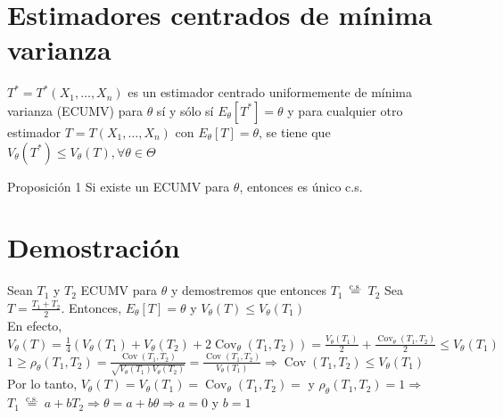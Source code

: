 \section*{Estimadores centrados de mínima varianza}
$T^{*}=T^{*}\left(X_{1}, \ldots, X_{n}\right)$ es un estimador centrado uniformemente de mínima varianza (ECUMV) para $\theta$ sí y sólo sí $E_{\theta}\left[T^{*}\right]=\theta$ y para cualquier otro estimador $T=T\left(X_{1}, \ldots, X_{n}\right)$ con $E_{\theta}[T]=\theta$, se tiene que $V_{\theta}\left(T^{*}\right) \leq V_{\theta}(T), \forall \theta \in \Theta$

Proposición 1 Si existe un ECUMV para $\theta$, entonces es único c.s.

\section*{Demostración}
Sean $T_{1}$ y $T_{2}$ ECUMV para $\theta$ y demostremos que entonces $T_{1} \stackrel{\text { c.s. }}{=} T_{2}$ Sea $T=\frac{T_{1}+T_{2}}{2}$. Entonces, $E_{\theta}[T]=\theta$ y $V_{\theta}(T) \leq V_{\theta}\left(T_{1}\right)$\\
En efecto, $V_{\theta}(T)=\frac{1}{4}\left(V_{\theta}\left(T_{1}\right)+V_{\theta}\left(T_{2}\right)+2 \operatorname{Cov}_{\theta}\left(T_{1}, T_{2}\right)\right)=\frac{V_{\theta}\left(T_{1}\right)}{2}+\frac{\operatorname{Cov}_{\theta}\left(T_{1}, T_{2}\right)}{2} \leq V_{\theta}\left(T_{1}\right)$\\
$1 \geq \rho_{\theta}\left(T_{1}, T_{2}\right)=\frac{\operatorname{Cov}\left(T_{1}, T_{2}\right)}{\sqrt{V_{\theta}\left(T_{1}\right) V_{\theta}\left(T_{2}\right)}}=\frac{\operatorname{Cov}\left(T_{1}, T_{2}\right)}{V_{\theta}\left(T_{1}\right)} \Rightarrow \operatorname{Cov}\left(T_{1}, T_{2}\right) \leq V_{\theta}\left(T_{1}\right)$\\
Por lo tanto, $V_{\theta}(T)=V_{\theta}\left(T_{1}\right)=\operatorname{Cov}_{\theta}\left(T_{1}, T_{2}\right)=$ y $\rho_{\theta}\left(T_{1}, T_{2}\right)=1 \Rightarrow$ $T_{1} \stackrel{\text { c.s. }}{=} a+b T_{2} \Rightarrow \theta=a+b \theta \Rightarrow a=0$ y $b=1$

